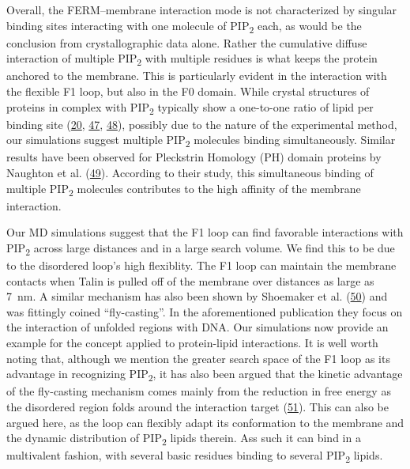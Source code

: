 \documentclass[
  twocolumn]{biophys-new-mod}
\begin{document}
Overall, the FERM--membrane interaction mode is not characterized by
singular binding sites interacting with one molecule of
PIP\textsubscript{2} each, as would be the conclusion from
crystallographic data alone. Rather the cumulative diffuse interaction
of multiple PIP\textsubscript{2} with multiple residues is what keeps
the protein anchored to the membrane. This is particularly evident in
the interaction with the flexible F1 loop, but also in the F0 domain.
While crystal structures of proteins in complex with
PIP\textsubscript{2} typically show a one-to-one ratio of lipid per
binding site
(\protect\hyperlink{ref-chinthalapudiInteractionTalinCell2018a}{20},
\protect\hyperlink{ref-chinthalapudiLipidBindingPromotes2018}{47},
\protect\hyperlink{ref-jianMolecularBasisCooperative2015}{48}), possibly
due to the nature of the experimental method, our simulations suggest
multiple PIP\textsubscript{2} molecules binding simultaneously. Similar
results have been observed for Pleckstrin Homology (PH) domain proteins
by Naughton et al.
(\protect\hyperlink{ref-naughtonModesInteractionPleckstrin2018}{49}).
According to their study, this simultaneous binding of multiple
PIP\textsubscript{2} molecules contributes to the high affinity of the
membrane interaction.

Our MD simulations suggest that the F1 loop can find favorable
interactions with PIP\textsubscript{2} across large distances and in a large
search volume. We find this to be due to the disordered loop's high flexiblity. The F1 loop can maintain the membrane contacts when
Talin is pulled off of the membrane over distances as large as 7~nm. A
similar mechanism has also been shown by Shoemaker et al.
(\protect\hyperlink{ref-shoemakerSpeedingMolecularRecognition2000}{50})
and was fittingly coined ``fly-casting''. In the aforementioned
publication they focus on the interaction of unfolded regions with DNA.
Our simulations now provide an example for the concept applied to
protein-lipid interactions. It is well worth noting that, although we
mention the greater search space of the F1 loop as its advantage in
recognizing PIP\textsubscript{2}, it has also been argued that the
kinetic advantage of the fly-casting mechanism comes mainly from the
reduction in free energy as the disordered region folds around the
interaction target
(\protect\hyperlink{ref-huangKineticAdvantageIntrinsically2009}{51}).
This can also be argued here, as the loop can flexibly adapt its
conformation to the membrane and the dynamic distribution of
PIP\textsubscript{2} lipids therein. Ass such it can bind in a multivalent fashion, with several basic residues binding to several PIP\textsubscript{2} lipids.
\end{document}
